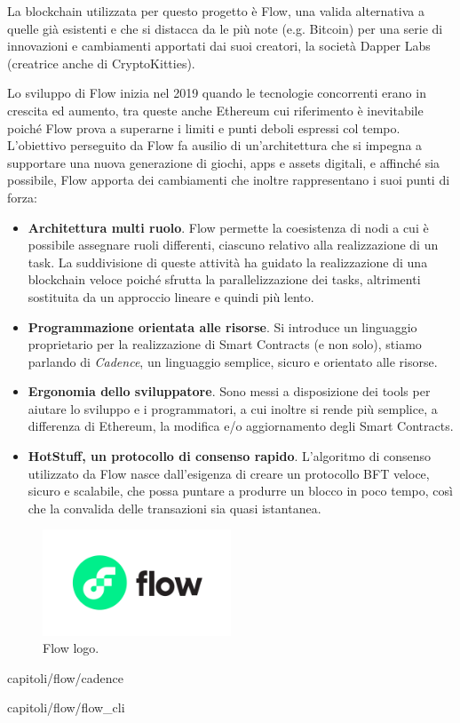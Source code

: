 La blockchain utilizzata per questo progetto è Flow, una valida alternativa a quelle già esistenti e che si distacca da le più note (e.g. Bitcoin) per una serie di innovazioni e cambiamenti apportati dai suoi creatori, la società Dapper Labs (creatrice anche di CryptoKitties). 

Lo sviluppo di Flow inizia nel 2019 quando le tecnologie concorrenti erano in crescita ed aumento, tra queste anche Ethereum cui riferimento è inevitabile poiché Flow prova a superarne i limiti e punti deboli espressi col tempo. L'obiettivo perseguito da Flow fa ausilio di un'architettura che si impegna a supportare una nuova generazione di giochi, apps e assets digitali, e affinché sia possibile, Flow apporta dei cambiamenti che inoltre rappresentano i suoi punti di forza: 

\begin{itemize}
    \item \textbf{Architettura multi ruolo}. Flow permette la coesistenza di nodi a cui è possibile assegnare ruoli differenti, ciascuno relativo alla realizzazione di un task. La suddivisione di queste attività ha guidato la realizzazione di una blockchain veloce poiché sfrutta la parallelizzazione dei tasks, altrimenti sostituita da un approccio lineare e quindi più lento.
    \item \textbf{Programmazione orientata alle risorse}. Si introduce un linguaggio proprietario per la realizzazione di Smart Contracts (e non solo), stiamo parlando di \textit{Cadence}, un linguaggio semplice, sicuro e orientato alle risorse.
    \item \textbf{Ergonomia dello sviluppatore}. Sono messi a disposizione dei tools per aiutare lo sviluppo e i programmatori, a cui inoltre si rende più semplice, a differenza di Ethereum, la modifica e/o aggiornamento degli Smart Contracts.
    \item \textbf{HotStuff, un protocollo di consenso rapido}. L'algoritmo di consenso utilizzato da Flow nasce dall'esigenza di creare un protocollo BFT veloce, sicuro e scalabile, che possa puntare a produrre un blocco in poco tempo, così che la convalida delle transazioni sia quasi istantanea.
\end{itemize}

\begin{figure}[h]
    \centering
    \includegraphics[width=0.5\textwidth]{tesina/img/FLOW-logo.png}
    \caption{Flow logo.}
    \label{fig:flow_logo}
\end{figure}


{capitoli/flow/cadence}

{capitoli/flow/flow_cli}